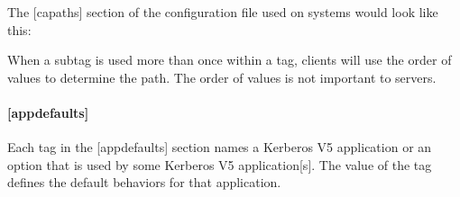 \documentclass[letterpaper,10pt,english]{sphinxmanual}
\begin{document}
\sphinxAtStartPar
The {[}capaths{]} section of the configuration file used on 
systems would look like this:

\begin{sphinxVerbatim}[commandchars=\\\{\}]
\PYG{p}{[}\PYG{p}{]}
      
          
          
          
          
          
      
          
      
          
      
          
      
          
          
\end{sphinxVerbatim}

\sphinxAtStartPar
When a subtag is used more than once within a tag, clients will use
the order of values to determine the path.  The order of values is not
important to servers.


\paragraph{{[}appdefaults{]}}
\label{\detokenize{admin/conf_files/krb5_conf:appdefaults}}\label{\detokenize{admin/conf_files/krb5_conf:id5}}
\sphinxAtStartPar
Each tag in the {[}appdefaults{]} section names a Kerberos V5 application
or an option that is used by some Kerberos V5 application{[}s{]}.  The
value of the tag defines the default behaviors for that application.
\end{document}
